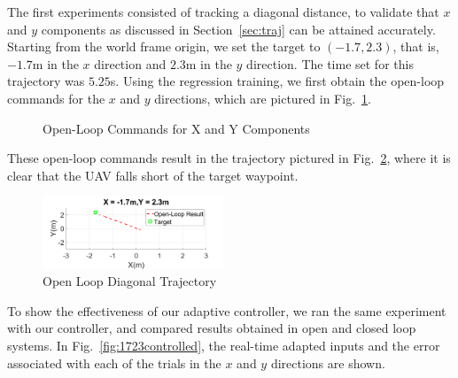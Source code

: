 \documentclass[letterpaper, 10 pt, conference]{ieeeconf}  %
\begin{document}
The first experiments consisted of tracking a diagonal distance, to validate that $x$ and $y$ components as discussed in Section~\ref{sec:traj} can be attained accurately. Starting from the world frame origin, we set the target to $(-1.7,2.3)$, that is, $-1.7$m in the $x$ direction and $2.3$m in the $y$ direction. The time set for this trajectory was $5.25$s. Using the regression training, we first obtain the open-loop commands for the $x$ and $y$ directions, which are pictured in Fig.~\ref{fig:1723cmds}.
\begin{figure}[h]
	\centering
	\caption{Open-Loop Commands for X and Y Components}
	\label{fig:1723cmds}
\end{figure}
These open-loop commands result in the trajectory pictured in Fig.~\ref{fig:1723open}, where it is clear that the UAV falls short of the target waypoint.
\begin{figure}[ht]
    \includegraphics[width=0.48\textwidth]{images/1723open.png}
    \caption{Open Loop Diagonal Trajectory}
    \label{fig:1723open}
\end{figure}

To show the effectiveness of our adaptive controller, we ran the same experiment with our controller, and compared results obtained in open and closed loop systems. In Fig.~\ref{fig:1723controlled}, the real-time adapted inputs and the error associated with each of the trials in the $x$ and $y$ directions are shown.
\end{document}
